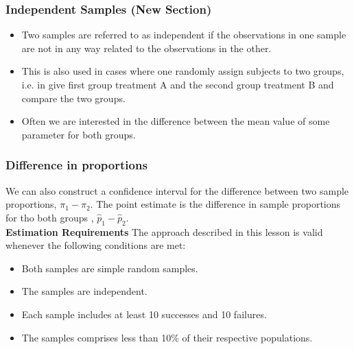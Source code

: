 \documentclass[a4]{beamer}
\begin{document}




\begin{frame}
\frametitle{Independent Samples (New Section)}
\begin{itemize}
\item Two samples are referred to as independent if the observations in one sample are not in any way related to the observations in the other. \item This is also used in cases where one randomly assign subjects to two groups, i.e. in give first group treatment A and the second group treatment B and compare the two groups.
\item Often we are interested in the difference between the mean value of some parameter for both groups.
\end{itemize}
\end{frame}

\begin{frame}
\frametitle{Difference in proportions}
We can also construct a confidence interval for the difference between two sample proportions, $\pi_1 - \pi_2$. The point estimate is the difference in sample proportions for tho both groups , $\hat{p}_1- \hat{p}_2$.\\\bigskip
\textbf{Estimation Requirements}
The approach described in this lesson is valid whenever the following conditions are met:

\begin{itemize}
\item Both samples are simple random samples.
\item The samples are independent.
\item Each sample includes at least 10 successes and 10 failures.
\item The samples comprises less than 10\% of their respective populations.
\end{itemize}
\end{frame}
\end{document}
